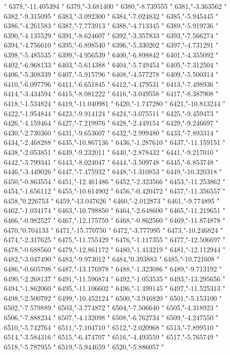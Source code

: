 "
6378,"-11.405394
"
6379,"-3.681400
"
6380,"-8.739555
"
6381,"-3.363562
"
6382,"-9.315095
"
6383,"-3.092300
"
6384,"-7.024832
"
6385,"-5.945445
"
6386,"-4.261583
"
6387,"-7.773913
"
6388,"-4.713345
"
6389,"-5.919736
"
6390,"-4.135529
"
6391,"-8.624607
"
6392,"-3.357833
"
6393,"-7.566274
"
6394,"-4.756610
"
6395,"-6.898540
"
6396,"-5.330202
"
6397,"-4.731291
"
6398,"-5.485535
"
6399,"-4.956539
"
6400,"-6.898842
"
6401,"-4.355092
"
6402,"-6.968133
"
6403,"-5.614388
"
6404,"-5.749454
"
6405,"-7.312504
"
6406,"-5.308339
"
6407,"-5.915796
"
6408,"-4.577278
"
6409,"-5.500314
"
6410,"-6.097796
"
6411,"-6.651845
"
6412,"-4.479531
"
6413,"-7.498936
"
6414,"-3.434594
"
6415,"-8.081222
"
6416,"-3.049558
"
6417,"-8.387908
"
6418,"-1.534824
"
6419,"-11.040981
"
6420,"-1.747280
"
6421,"-10.813244
"
6422,"-1.954844
"
6423,"-9.914124
"
6424,"-3.075511
"
6425,"-9.459473
"
6426,"-4.159464
"
6427,"-7.219976
"
6428,"-2.449154
"
6429,"-9.246697
"
6430,"-2.730360
"
6431,"-9.653607
"
6432,"-2.999480
"
6433,"-7.893314
"
6434,"-2.468288
"
6435,"-10.867136
"
6436,"-1.287610
"
6437,"-11.159151
"
6438,"-2.053851
"
6439,"-9.232011
"
6440,"-2.878432
"
6441,"-9.217010
"
6442,"-3.799341
"
6443,"-8.024047
"
6444,"-3.509748
"
6445,"-6.853748
"
6446,"-3.449026
"
6447,"-7.475932
"
6448,"-1.310853
"
6449,"-10.320318
"
6450,"-0.863554
"
6451,"-12.461486
"
6452,"-2.323566
"
6453,"-11.253862
"
6454,"-1.656112
"
6455,"-10.614902
"
6456,"-0.420472
"
6457,"-11.356557
"
6458,"0.226753
"
6459,"-13.047626
"
6460,"-2.012873
"
6461,"-9.774895
"
6462,"-1.034174
"
6463,"-10.798850
"
6464,"-2.648600
"
6465,"-11.219651
"
6466,"-0.982527
"
6467,"-12.175759
"
6468,"-0.862560
"
6469,"-11.874878
"
6470,"0.704133
"
6471,"-15.770750
"
6472,"-3.777995
"
6473,"-10.246824
"
6474,"-2.317625
"
6475,"-11.755429
"
6476,"-1.117355
"
6477,"-12.506697
"
6478,"-0.688560
"
6479,"-12.861172
"
6480,"-1.413219
"
6481,"-12.112944
"
6482,"-3.047490
"
6483,"-9.973012
"
6484,"0.393883
"
6485,"-10.721608
"
6486,"-0.605798
"
6487,"-13.176978
"
6488,"-1.323086
"
6489,"-9.713192
"
6490,"-2.268137
"
6491,"-11.596874
"
6492,"-1.053535
"
6493,"-13.295656
"
6494,"-1.862060
"
6495,"-11.106602
"
6496,"-1.499145
"
6497,"-11.525313
"
6498,"-2.500792
"
6499,"-10.452124
"
6500,"-3.946820
"
6501,"-5.153100
"
6502,"-7.579889
"
6503,"-3.774872
"
6504,"-7.506640
"
6505,"-4.318923
"
6506,"-7.888234
"
6507,"-4.132098
"
6508,"-6.762734
"
6509,"-4.247550
"
6510,"-5.742764
"
6511,"-7.104710
"
6512,"-2.020968
"
6513,"-7.899510
"
6514,"-3.584316
"
6515,"-6.474707
"
6516,"-4.493559
"
6517,"-5.765749
"
6518,"-5.787955
"
6519,"-5.944659
"
6520,"-5.886057
"
